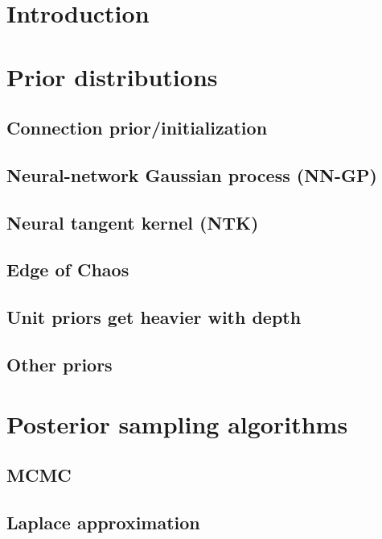 \section{Introduction}

\section{Prior distributions}

\subsection{Connection prior/initialization}


\subsection{Neural-network Gaussian process (NN-GP)}



\subsection{Neural tangent kernel (NTK)}



\subsection{Edge of Chaos}


\subsection{Unit priors get heavier with depth}


\subsection{Other priors}

\section{Posterior sampling algorithms}

\subsection{MCMC}



\subsection{Laplace approximation}


